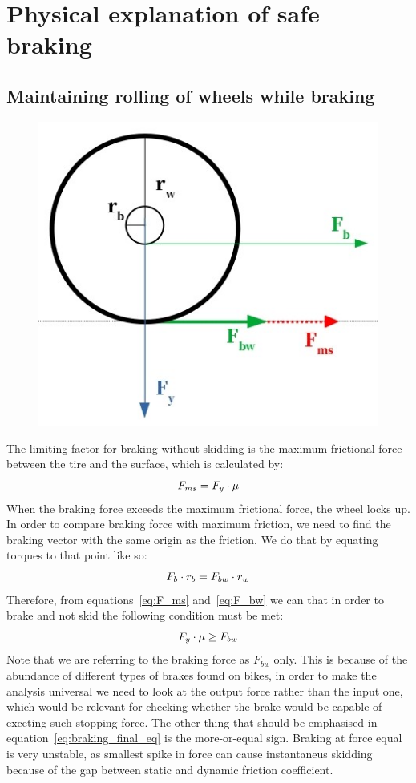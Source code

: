 \documentclass[12pt]{article}
\begin{document}
\section{Physical explanation of safe braking}
\subsection{Maintaining rolling of wheels while braking}
\begin{figure}[H]
\centering
\caption{}
\includegraphics[width=0.5\linewidth]{wheel_braking_forces}%
\label{fig:wheel_diagram_1}
\end{figure}
The limiting factor for braking without skidding is the maximum frictional force between the tire and the 
surface, which is calculated by:
\begin{equation}
\centering%
\label{eq:F_ms}
F_{ms} = F_y \cdot \mu
\end{equation}
When the braking force exceeds the maximum frictional force, the wheel locks up. In order to compare braking 
force with maximum friction, we need to find the braking vector with the same origin as the friction. We do 
that by equating torques to that point like so:
\begin{equation}
\centering%
\label{eq:F_bw}
F_b \cdot r_b = F_{bw} \cdot r_w
\end{equation}
Therefore, from equations~\ref{eq:F_ms} and~\ref{eq:F_bw} we can that in order to brake and not skid the following
condition must be met:
\begin{equation}
\centering%
\label{eq:braking_final_eq}
F_y \cdot \mu \geq F_{bw}
\end{equation}
Note that we are referring to the braking force as $F_{bw}$ only. This is because of the abundance of different
types of brakes found on bikes, in order to make the analysis universal we need to look at the output force rather
than the input one, which would be relevant for checking whether the brake would be capable of exceting
such stopping force. The other thing that should be emphasised in equation~\ref{eq:braking_final_eq} is the 
more-or-equal sign. Braking at force equal is very unstable, as smallest spike in force can cause instantaneus 
skidding because of the gap between static and dynamic friction coefficient.
\end{document}
